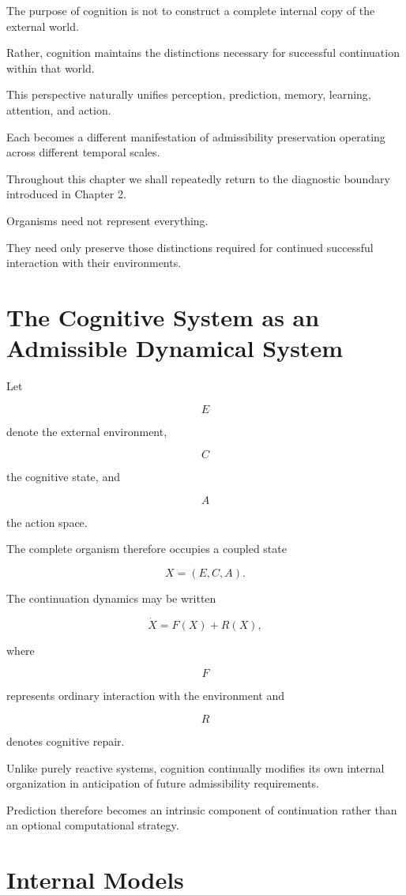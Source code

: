 \documentclass[11pt,oneside]{book}
\numberwithin{equation}{chapter}
\theoremstyle{definition}
\theoremstyle{plain}
\begin{document}
The purpose of cognition is not to construct a complete internal copy of the
external world.

Rather, cognition maintains the distinctions necessary for successful
continuation within that world.

This perspective naturally unifies perception, prediction, memory, learning,
attention, and action.

Each becomes a different manifestation of admissibility preservation
operating across different temporal scales.

Throughout this chapter we shall repeatedly return to the diagnostic
boundary introduced in Chapter 2.

Organisms need not represent everything.

They need only preserve those distinctions required for continued
successful interaction with their environments.

\section{The Cognitive System as an Admissible Dynamical System}

Let

\[
E
\]

denote the external environment,

\[
C
\]

the cognitive state, and

\[
A
\]

the action space.

The complete organism therefore occupies a coupled state

\[
X=(E,C,A).
\]

The continuation dynamics may be written

\[
\dot X = F(X) + R(X),
\]

where

\[
F
\]

represents ordinary interaction with the environment and

\[
R
\]

denotes cognitive repair.

Unlike purely reactive systems, cognition continually modifies its own
internal organization in anticipation of future admissibility requirements.

Prediction therefore becomes an intrinsic component of continuation rather
than an optional computational strategy.

\section{Internal Models}
\end{document}
